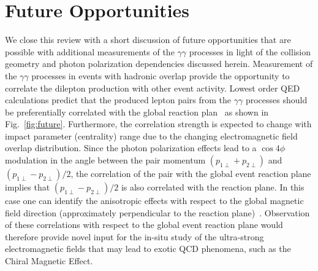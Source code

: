 \documentclass[twocolumn,epjc3]{svjour3}\sloppy
\begin{document}
\section{Future Opportunities}
\label{sec:future}
We close this review with a short discussion of future opportunities that are possible with additional measurements of the $\gamma\gamma$ processes in light of the collision geometry and photon polarization dependencies discussed herein. Measurement of the $\gamma\gamma$ processes in events with hadronic overlap provide the opportunity to correlate the dilepton production with other event activity. Lowest order QED calculations predict that the produced lepton pairs from the $\gamma\gamma$ processes should be preferentially correlated with the global reaction plan~\cite{zhaInitialTransversemomentumBroadening2020b} as shown in Fig.~\ref{fig:future}. Furthermore, the correlation strength is expected to change with impact parameter (centrality) range due to the changing electromagnetic field overlap distribution. 
Since the photon polarization effects lead to a $\cos4\phi$ modulation in the angle between the pair momentum $(p_{1\perp} + p_{2\perp})$ and $(p_{1\perp} - p_{2\perp})/2$, the correlation of the pair with the global event reaction plane implies that $(p_{1\perp} - p_{2\perp})/2$ is also correlated with the reaction plane. 
In this case one can identify the anisotropic effects with respect to the global magnetic field direction (approximately perpendicular to the reaction plane)~\cite{skokovEstimateMagneticField2009}.
Observation of these correlations with respect to the global event reaction plane would therefore provide novel input for the in-situ study of the ultra-strong electromagnetic fields that may lead to exotic QCD phenomena, such as the Chiral Magnetic Effect. 
\end{document}
